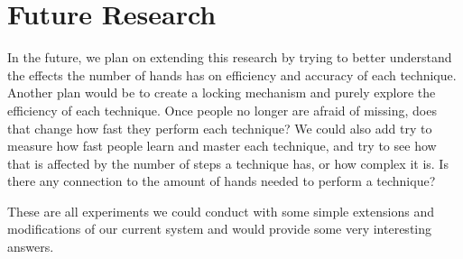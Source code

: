 \section{Future Research} \label{sec:futureresearch}
In the future, we plan on extending this research by trying to better understand the effects the number of hands has on efficiency and accuracy of each technique.
Another plan would be to create a locking mechanism and purely explore the efficiency of each technique. 
Once people no longer are afraid of missing, does that change how fast they perform each technique?
We could also add try to measure how fast people learn and master each technique, and try to see how that is affected by the number of steps a technique has, or how complex it is. 
Is there any connection to the amount of hands needed to perform a technique?

These are all experiments we could conduct with some simple extensions and modifications of our current system and would provide some very interesting answers.